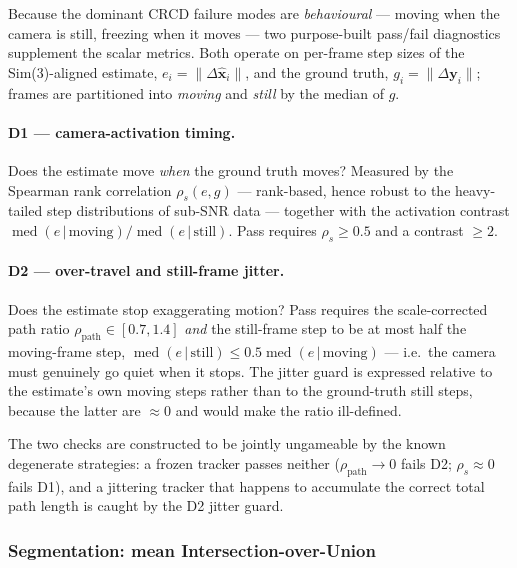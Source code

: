 Because the dominant CRCD failure modes are \emph{behavioural} --- moving when the
camera is still, freezing when it moves --- two purpose-built pass/fail
diagnostics supplement the scalar metrics. Both operate on per-frame step sizes
of the Sim(3)-aligned estimate, $e_i = \lVert \Delta \hat{\mathbf{x}}_i \rVert$,
and the ground truth, $g_i = \lVert \Delta \mathbf{y}_i \rVert$; frames are
partitioned into \emph{moving} and \emph{still} by the median of $g$.

\paragraph{D1 — camera-activation timing.} Does the estimate move \emph{when} the
ground truth moves? Measured by the Spearman rank correlation
$\rho_s(e, g)$ --- rank-based, hence robust to the heavy-tailed step
distributions of sub-SNR data --- together with the activation contrast
$\operatorname{med}(e \,|\, \mathrm{moving}) / \operatorname{med}(e \,|\, \mathrm{still})$.
Pass requires $\rho_s \geq 0.5$ and a contrast $\geq 2$.

\paragraph{D2 — over-travel and still-frame jitter.} Does the estimate stop
exaggerating motion? Pass requires the scale-corrected path ratio
$\rho_{\mathrm{path}} \in [0.7, 1.4]$ \emph{and} the still-frame step to be at
most half the moving-frame step,
$\operatorname{med}(e \,|\, \mathrm{still}) \leq 0.5 \operatorname{med}(e \,|\, \mathrm{moving})$
--- i.e.\ the camera must genuinely go quiet when it stops. The jitter guard is
expressed relative to the estimate's own moving steps rather than to the
ground-truth still steps, because the latter are ${\approx}0$ and would make the
ratio ill-defined.

The two checks are constructed to be jointly ungameable by the known degenerate
strategies: a frozen tracker passes neither ($\rho_{\mathrm{path}} \to 0$ fails
D2; $\rho_s \approx 0$ fails D1), and a jittering tracker that happens to
accumulate the correct total path length is caught by the D2 jitter guard.

\subsubsection{Segmentation: mean Intersection-over-Union}
\label{sec:eval_miou}

